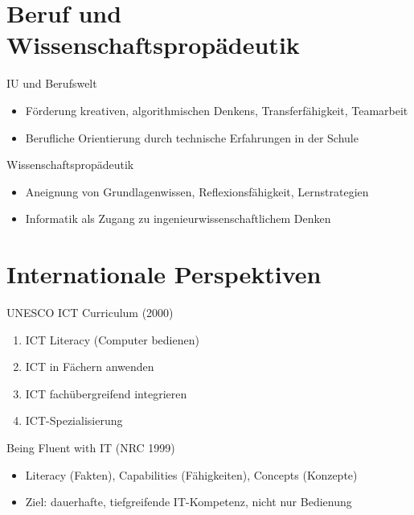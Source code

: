 \documentclass{article}
\begin{document}
\section{Beruf und Wissenschaftspropädeutik}

\begin{block}{IU und Berufswelt}
    \begin{itemize}
        \item Förderung kreativen, algorithmischen Denkens, Transferfähigkeit, Teamarbeit
        \item Berufliche Orientierung durch technische Erfahrungen in der Schule
    \end{itemize}
\end{block}

\begin{block}{Wissenschaftspropädeutik}
    \begin{itemize}
        \item Aneignung von Grundlagenwissen, Reflexionsfähigkeit, Lernstrategien
        \item Informatik als Zugang zu ingenieurwissenschaftlichem Denken
    \end{itemize}
\end{block}

\section{Internationale Perspektiven}
\begin{block}{UNESCO ICT Curriculum (2000)}
    \begin{enumerate}
        \item ICT Literacy (Computer bedienen)
        \item ICT in Fächern anwenden
        \item ICT fachübergreifend integrieren
        \item ICT-Spezialisierung
    \end{enumerate}
\end{block}

\begin{block}{Being Fluent with IT (NRC 1999)}
    \begin{itemize}
        \item Literacy (Fakten), Capabilities (Fähigkeiten), Concepts (Konzepte)
        \item Ziel: dauerhafte, tiefgreifende IT-Kompetenz, nicht nur Bedienung
    \end{itemize}
\end{block}
\end{document}
